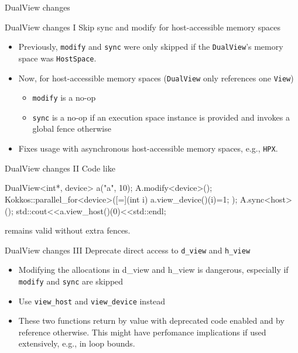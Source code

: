 
\begin{frame}[fragile]\label{sec:dualview}

  {\Huge DualView changes}

  \vspace{10pt}

\end{frame}





\begin{frame}[fragile]{DualView changes I}
  Skip sync and modify for host-accessible memory spaces
  \begin{itemize}
      \item Previously, \texttt{modify} and \texttt{sync} were only skipped if the \texttt{DualView}'s memory space was \texttt{HostSpace}.
      \item Now, for host-accessible memory spaces (\texttt{DualView} only references one \texttt{View})
        \begin{itemize}
          \item \texttt{modify} is a no-op
          \item \texttt{sync} is a no-op if an execution space instance is provided and invokes a global fence otherwise
        \end{itemize}
      \item Fixes usage with asynchronous host-accessible memory spaces, e.g., \texttt{HPX}.
  \end{itemize}
\end{frame}
\begin{frame}[fragile]{DualView changes II}
  Code like
  \begin{code}[keywords={std}]
    DualView<int*, device> a("a", 10);
    A.modify<device>();
    Kokkos::parallel_for<device>([=](int i){
      a.view_device()(i)=1;
    });
    A.sync<host>();
    std::cout<<a.view_host()(0)<<std::endl;
  \end{code}
 
  remains valid without extra fences.
\end{frame}

\begin{frame}[fragile]{DualView changes III}
  Deprecate direct access to \texttt{d\_view} and \texttt{h\_view}
  \begin{itemize}
    \item Modifying the allocations in d\_view and h\_view is dangerous, especially if \texttt{modify} and \texttt{sync} are skipped
    \item Use \texttt{view\_host} and \texttt{view\_device} instead
    \item These two functions return by value with deprecated code enabled and by reference otherwise. This might have perfomance implications if used extensively, e.g., in loop bounds.
  \end{itemize}
\end{frame}



